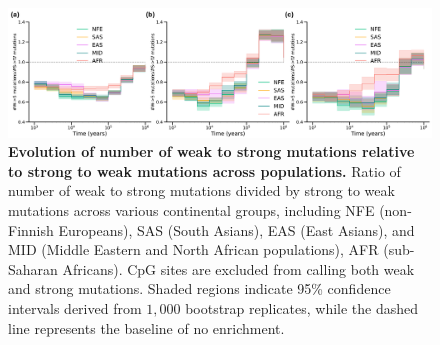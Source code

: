 \begin{figure}
    \centering
    \includegraphics[width=\linewidth]{figures/gb_bta/gb_real_bta_ws_vs_sw.pdf}
    \caption{\textbf{Evolution of number of weak to strong mutations relative to strong to weak mutations across populations.} Ratio of number of weak to strong mutations divided by strong to weak mutations across various continental groups, including NFE (non-Finnish Europeans), SAS (South Asians), EAS (East Asians), and MID (Middle Eastern and North African populations), AFR (sub-Saharan Africans). CpG sites are excluded from calling both weak and strong mutations. Shaded regions indicate 95\% confidence intervals derived from $1{,}000$ bootstrap replicates, while the dashed line represents the baseline of no enrichment. }
    \label{fig:gb_bta_ws_vs_sw}
\end{figure}



